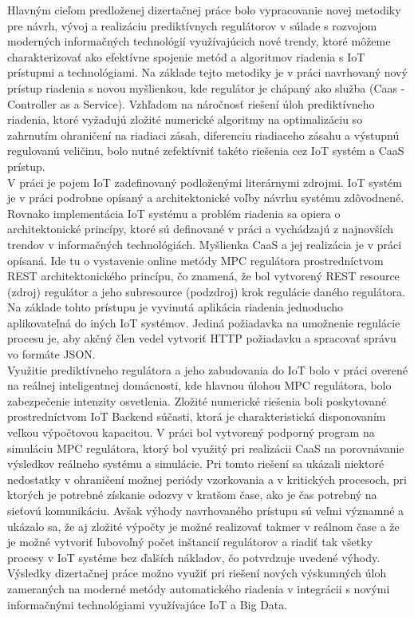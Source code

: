 Hlavným cieľom predloženej dizertačnej práce bolo vypracovanie novej metodiky pre návrh, vývoj a realizáciu prediktívnych regulátorov v súlade s rozvojom moderných informačných technológií využívajúcich nové trendy, ktoré môžeme charakterizovať ako efektívne spojenie metód a algoritmov riadenia s IoT prístupmi a technológiami. Na základe tejto metodiky je v práci navrhovaný nový prístup riadenia s novou myšlienkou, kde regulátor je chápaný ako služba (Caas - Controller as a Service). Vzhľadom na náročnosť riešení úloh prediktívneho riadenia, ktoré vyžadujú zložité numerické algoritmy na optimalizáciu so zahrnutím ohraničení na riadiaci zásah, diferenciu riadiaceho zásahu a výstupnú regulovanú veličinu, bolo nutné zefektívniť takéto riešenia cez IoT systém a CaaS prístup.\\
V práci je pojem IoT zadefinovaný podloženými literárnymi zdrojmi. IoT systém je v práci podrobne opísaný a architektonické voľby návrhu systému zdôvodnené. Rovnako implementácia IoT systému a problém riadenia sa opiera o architektonické princípy, ktoré sú definované v práci a vychádzajú z najnovších trendov v informačných technológiách. Myšlienka CaaS a jej realizácia je v práci opísaná. Ide tu o vystavenie online metódy MPC regulátora prostredníctvom REST architektonického princípu, čo znamená, že bol vytvorený REST resource (zdroj) regulátor a jeho subresource (podzdroj) krok regulácie daného regulátora. Na základe tohto prístupu je vyvinutá aplikácia riadenia jednoducho aplikovateľná do iných IoT systémov. Jediná požiadavka na umožnenie regulácie procesu je, aby akčný člen vedel vytvoriť HTTP požiadavku a spracovať správu vo formáte JSON.\\
Využitie prediktívneho regulátora a jeho zabudovania do IoT bolo v práci overené na reálnej inteligentnej domácnosti, kde hlavnou úlohou MPC regulátora, bolo zabezpečenie intenzity osvetlenia. Zložité numerické riešenia boli poskytované prostredníctvom IoT Backend súčasti, ktorá je charakteristická disponovaním veľkou výpočtovou kapacitou. V práci bol vytvorený podporný program na simuláciu MPC regulátora, ktorý bol využitý pri realizácii CaaS na porovnávanie výsledkov reálneho systému a simulácie. Pri tomto riešení sa ukázali niektoré nedostatky v ohraničení možnej periódy vzorkovania a v kritických procesoch, pri ktorých je potrebné získanie odozvy v kratšom čase, ako je čas potrebný na sieťovú komunikáciu. Avšak výhody navrhovaného prístupu sú veľmi významné a ukázalo sa, že aj zložité výpočty je možné realizovať takmer v reálnom čase a že je možné vytvoriť ľubovoľný počet inštancií regulátorov a riadiť tak všetky procesy v IoT systéme bez ďalších nákladov, čo potvrdzuje uvedené výhody.\\
Výsledky dizertačnej práce možno využiť pri riešení nových výskumných úloh zameraných na moderné metódy automatického riadenia v integrácii s novými informačnými technológiami využívajúce IoT a Big Data.
